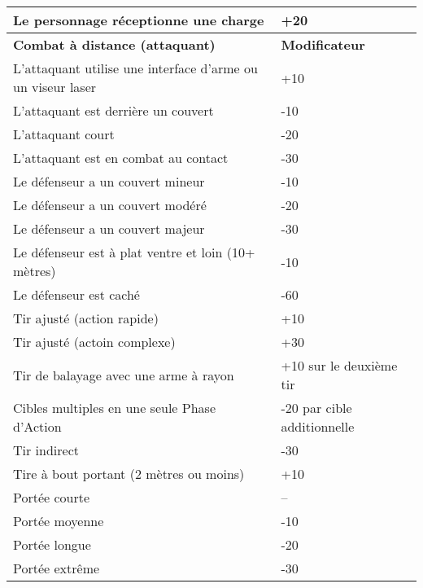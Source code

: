 \begin{table}
\begin{tabularx}{\textwidth}{|X|l|}
Le personnage réceptionne une charge &+20	\\ \hline

\textbf{Combat à distance (attaquant)} &\textbf{Modificateur}	\\ \hline

L'attaquant utilise une interface d'arme ou un viseur laser	&+10	\\ \hline

L'attaquant est derrière un couvert &-10	\\ \hline

L'attaquant court &-20	\\ \hline

L'attaquant est en combat au contact &-30	\\ \hline

Le défenseur a un couvert mineur &-10	\\ \hline

Le défenseur a un couvert modéré &-20	\\ \hline

Le défenseur a un couvert majeur &-30	\\ \hline

Le défenseur est à plat ventre et loin (10+ mètres) &-10	\\ \hline

Le défenseur est caché &-60	\\ \hline

Tir ajusté (action rapide) &+10	\\ \hline

Tir ajusté (actoin complexe) &+30	\\ \hline

Tir de balayage avec une arme à rayon &+10 sur le deuxième tir	\\ \hline

Cibles multiples en une seule Phase d'Action &-20 par cible additionnelle \\ \hline

Tir indirect &-30	\\ \hline

Tire à bout portant (2 mètres ou moins) &+10	\\ \hline

Portée courte &--	\\ \hline

Portée moyenne &-10	\\ \hline

Portée longue &-20	\\ \hline

Portée extrême &-30	\\ \hline

\end{tabularx} \label{tab:combat-modifiers} \end{table} 



